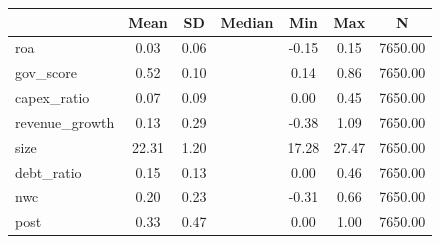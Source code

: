 {
\def\sym#1{\ifmmode^{#1}\else\(^{#1}\)\fi}
\begin{tabular}{l*{1}{cccccc}}
\toprule
                    &        Mean&          SD&      Median&         Min&         Max&           N\\
\midrule
roa                 &        0.03&        0.06&            &       -0.15&        0.15&     7650.00\\
gov\_score           &        0.52&        0.10&            &        0.14&        0.86&     7650.00\\
capex\_ratio         &        0.07&        0.09&            &        0.00&        0.45&     7650.00\\
revenue\_growth      &        0.13&        0.29&            &       -0.38&        1.09&     7650.00\\
size                &       22.31&        1.20&            &       17.28&       27.47&     7650.00\\
debt\_ratio          &        0.15&        0.13&            &        0.00&        0.46&     7650.00\\
nwc                 &        0.20&        0.23&            &       -0.31&        0.66&     7650.00\\
post                &        0.33&        0.47&            &        0.00&        1.00&     7650.00\\
\bottomrule
\end{tabular}
}
